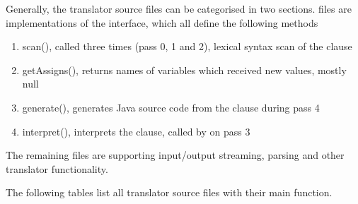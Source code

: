 Generally, the translator source files can be categorised in two sections.
 files are implementations
of the  interface, which all define the following methods
\begin{enumerate}
    \item scan(), called three times (pass 0, 1 and 2), lexical syntax scan of the \nr{} clause
    \item getAssigns(), returns names of variables which received new values, mostly null
    \item generate(), generates Java source code from the \nr{} clause during pass 4
    \item interpret(), interprets the \nr{} clause, called by  on pass 3
\end{enumerate}

The remaining  files are supporting input/output streaming, parsing and other translator functionality.


The following tables list all translator source files with their main function.

